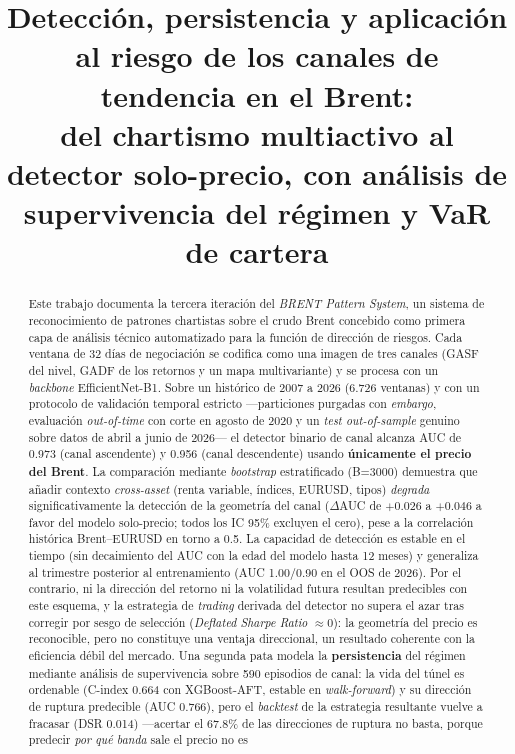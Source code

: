 \documentclass[11pt,a4paper]{article}
\title{Detección, persistencia y aplicación al riesgo de los canales de tendencia
en el Brent:\\
del chartismo multiactivo al detector solo-precio, con análisis de supervivencia
del régimen y VaR de cartera}
\author{}
\date{}
\begin{document}
\maketitle

\begin{abstract}
Este trabajo documenta la tercera iteración del \emph{BRENT Pattern System}, un
sistema de reconocimiento de patrones chartistas sobre el crudo Brent concebido
como primera capa de análisis técnico automatizado para la función de dirección
de riesgos. Cada ventana de 32 días de negociación se codifica como una imagen
de tres canales (GASF del nivel, GADF de los retornos y un mapa multivariante) y
se procesa con un \emph{backbone} EfficientNet-B1. Sobre un histórico de 2007 a
2026 (6.726 ventanas) y con un protocolo de validación temporal estricto
—particiones purgadas con \emph{embargo}, evaluación \emph{out-of-time} con corte
en agosto de 2020 y un \emph{test out-of-sample} genuino sobre datos de abril a
junio de 2026— el detector binario de canal alcanza AUC de 0.973 (canal
ascendente) y 0.956 (canal descendente) usando \textbf{únicamente el precio del
Brent}. La comparación mediante \emph{bootstrap} estratificado (B=3000) demuestra
que añadir contexto \emph{cross-asset} (renta variable, índices, EURUSD, tipos)
\emph{degrada} significativamente la detección de la geometría del canal
($\Delta$AUC de $+0.026$ a $+0.046$ a favor del modelo solo-precio; todos los IC
95\% excluyen el cero), pese a la correlación histórica Brent--EURUSD en torno a
0.5. La capacidad de detección es estable en el tiempo (sin decaimiento del AUC
con la edad del modelo hasta 12 meses) y generaliza al trimestre posterior al
entrenamiento (AUC 1.00/0.90 en el OOS de 2026). Por el contrario, ni la
dirección del retorno ni la volatilidad futura resultan predecibles con este
esquema, y la estrategia de \emph{trading} derivada del detector no supera el
azar tras corregir por sesgo de selección (\emph{Deflated Sharpe Ratio}
$\approx 0$): la geometría del precio es reconocible, pero no constituye una
ventaja direccional, un resultado coherente con la eficiencia débil del mercado.
Una segunda pata modela la \textbf{persistencia} del régimen mediante análisis de
supervivencia sobre 590 episodios de canal: la vida del túnel es ordenable
(C-index 0.664 con XGBoost-AFT, estable en \emph{walk-forward}) y su dirección de
ruptura predecible (AUC 0.766), pero el \emph{backtest} de la estrategia
resultante vuelve a fracasar (DSR 0.014) —acertar el 67.8\% de las direcciones de
ruptura no basta, porque predecir \emph{por qué banda} sale el precio no es

\end{abstract}
\end{document}
